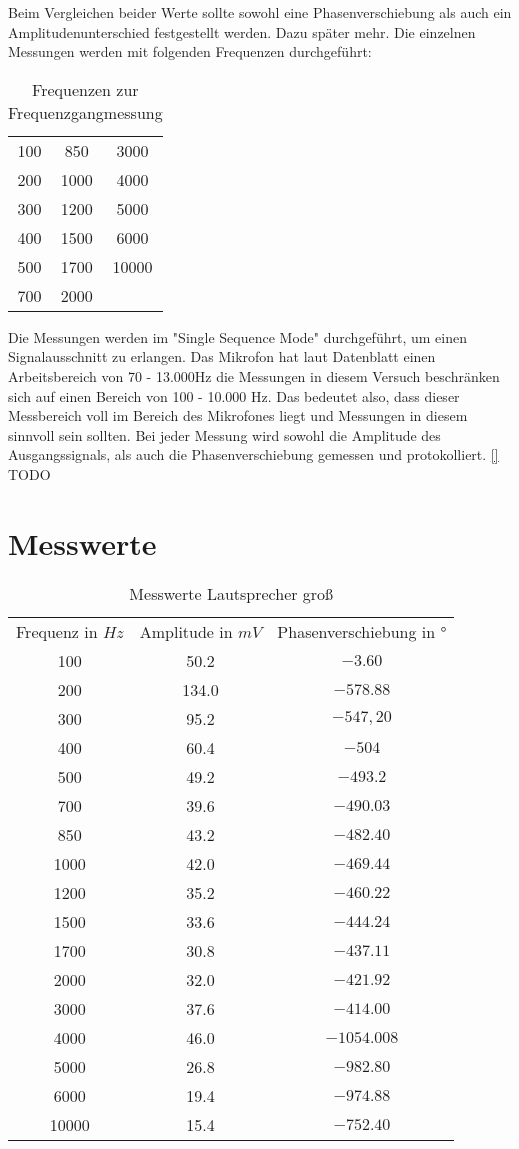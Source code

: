 Beim Vergleichen beider Werte sollte sowohl eine Phasenverschiebung als auch ein Amplitudenunterschied festgestellt werden. Dazu später mehr.
Die einzelnen Messungen werden mit folgenden Frequenzen durchgeführt: 
\begin{table}
\begin{tabular}{|c|c|c|}
100 & 850  & 3000 \\
200 & 1000 & 4000 \\
300 & 1200 & 5000 \\
400 & 1500 & 6000 \\
500 & 1700 & 10000 \\
700 & 2000 & \\
\end{tabular}
\centering
\label{tab:Frequences}
\caption{Frequenzen zur Frequenzgangmessung}
\end{table}
Die Messungen werden im "Single Sequence Mode" durchgeführt, um einen Signalausschnitt zu erlangen. Das Mikrofon hat laut Datenblatt einen Arbeitsbereich von 70 - 13.000Hz die Messungen in diesem Versuch beschränken sich auf einen Bereich von 100 - 10.000 Hz. Das bedeutet also, dass dieser Messbereich voll im Bereich des Mikrofones liegt und Messungen in diesem sinnvoll sein sollten.
Bei jeder Messung wird sowohl die Amplitude des Ausgangssignals, als auch die Phasenverschiebung gemessen und protokolliert. \ref{} TODO
\label{chap:VERSUCH_2_FRAGESTELLUNG}

\section{Messwerte}
\label{chap:VERSUCH_2_MESSWERTE}
\begin{table}[H]
\centering
\begin{tabular}{ccc}
  Frequenz in $Hz$ & Amplitude in $mV$ &  Phasenverschiebung in $°$ \\
  100 & 50.2 & $-3.60$ \\
  200 & 134.0 & $-578.88$ \\
  300 & 95.2 & $-547,20$ \\
  400 & 60.4 & $-504$ \\
  500 & 49.2 & $-493.2$ \\
  700 & 39.6 & $-490.03$ \\
  850 & 43.2 & $-482.40$ \\
  1000 & 42.0 & $-469.44$ \\
  1200 & 35.2 & $-460.22$ \\
  1500 & 33.6 & $-444.24$ \\
  1700 & 30.8 & $-437.11$ \\
  2000 & 32.0 & $-421.92$ \\
  3000 & 37.6 & $-414.00$ \\
  4000 & 46.0 & $-1054.008$ \\
  5000 & 26.8 & $-982.80$ \\
  6000 & 19.4 & $-974.88$ \\
  10000 & 15.4 & $-752.40$ \\
 \end{tabular}
\label{tab:MLg}
\caption{Messwerte Lautsprecher groß}
\end{table}

